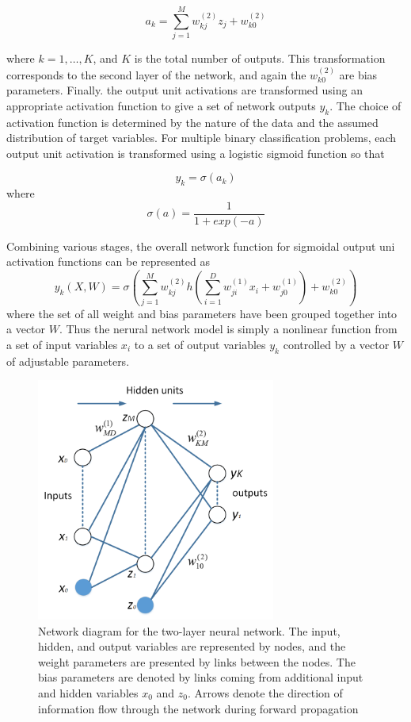 \begin{equation}
a_{k}=\sum_{j=1}^{M}w_{kj}^{(2)}z_{j}+w_{k0}^{(2)}
\end{equation}


where $k = 1,\ldots ,K$, and $K$ is the total number of outputs. This transformation corresponds to the second layer of the network, and again the $w_{k0}^{(2)}$ are bias parameters. Finally. the output unit activations are transformed using an appropriate activation function to give a set of network outputs $y_{k}$. The choice of activation function is determined by the nature of the data and the assumed distribution of target variables. For multiple binary classification problems, each output unit activation is transformed using a logistic sigmoid function so that

\begin{equation}
y_{k}= \sigma(a_{k})
\end{equation}
where
\begin{equation}
\sigma(a)=\frac{1}{1+exp(-a)}
\end{equation}

Combining various stages, the overall network function for sigmoidal output uni activation functions can be represented as
\begin{equation}
y_{k}(X,W)=\sigma(\sum_{j=1}^{M}w_{kj}^{(2)}h(\sum_{i=1}^{D}w_{ji}^{(1)}x_{i}+w_{j0}^{(1)})+w_{k0}^{(2)})
\end{equation}
where the set of all weight and bias parameters have been grouped together into a vector $W$. Thus the nerural network model is simply a nonlinear function from a set of input variables ${x_{i}}$ to a set of output variables $y_{k}$ controlled by a vector $W$ of adjustable parameters.


\begin{figure}[htb!]
\centering
\includegraphics[width=0.7\textwidth]{image/Method/ANN.png}
\caption[An ANN classifier]{Network diagram for the two-layer neural network. The input, hidden, and output variables are represented by nodes, and the weight parameters are presented by links between the nodes. The bias parameters are denoted by links coming from additional input and hidden variables $x_{0}$ and $z_{0}$. Arrows denote the direction of information flow through the network during forward propagation}
\label{fig:ANN}
\end{figure}


